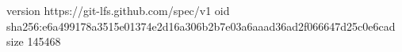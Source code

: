 version https://git-lfs.github.com/spec/v1
oid sha256:e6a499178a3515e01374e2d16a306b2b7e03a6aaad36ad2f066647d25c0e6cad
size 145468
